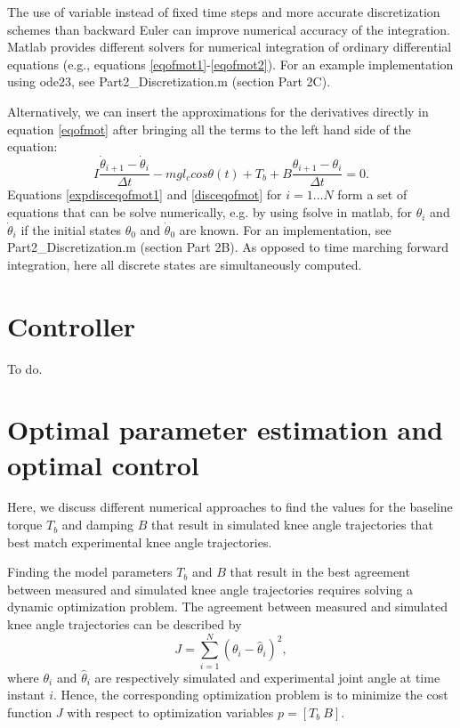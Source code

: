 \documentclass[
a4paper, %
11pt, %
onecolumn, %
openright, %
]{memoir}
\begin{document}
The use of variable instead of fixed time steps and more accurate discretization schemes than backward Euler can improve numerical accuracy of the integration. Matlab provides different solvers for numerical integration of ordinary differential equations (e.g., equations \ref{eqofmot1}-\ref{eqofmot2}). For an example implementation using ode23, see Part2\_Discretization.m (section Part 2C).

Alternatively, we can insert the approximations for the derivatives directly in equation \ref{eqofmot} after bringing all the terms to the left hand side of the equation:
\begin{equation}
I \frac{\dot\theta_{i+1} - \dot\theta_{i}}{\Delta t} - m g l_c cos\theta(t) + T_b + B \frac{\theta_{i+1} - \theta_{i}}{\Delta t} = 0.
\label{disceqofmot}
\end{equation}
Equations \ref{expdisceqofmot1} and \ref{disceqofmot} for $i = 1 \ldots N$ form a set of equations that can be solve numerically, e.g. by using fsolve in matlab, for $\theta_i$ and $\dot{\theta}_i$ if the initial states $\theta_0$ and $\dot{\theta}_0$ are known.  
For an implementation, see Part2\_Discretization.m (section Part 2B).
As opposed to time marching forward integration, here all discrete states are simultaneously computed. %


\chapter{Controller}

To do.

\chapter{Optimal parameter estimation and optimal control}

Here, we discuss different numerical approaches to find the values for the baseline torque $T_b$ and damping $B$ that result in simulated knee angle trajectories that best match experimental knee angle trajectories. 

Finding the model parameters $T_b$ and $B$ that result in the best agreement between measured and simulated knee angle trajectories requires solving a dynamic optimization problem. The agreement between measured and simulated knee angle trajectories can be described by
\begin{equation}
J = \sum_{i = 1}^{N} ( \theta_i - \hat{\theta}_i )^2,
\end{equation}
where $\theta_i$ and $\hat{\theta}_i$ are respectively simulated and experimental joint angle at time instant $i$. Hence, the corresponding optimization problem is to minimize the cost function $J$ with respect to optimization variables $ p = [T_b \: B]$. 
\end{document}
